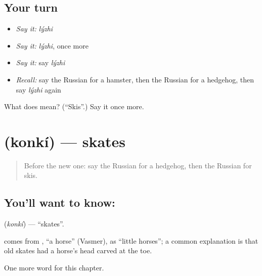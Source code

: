 \subsection*{Your turn}
\begin{itemize}
\raggedright
  \item \emph{Say it:} \emph{lýzhi}
  \item \emph{Say it:} \emph{lýzhi}, once more
  \item \emph{Say it:} say \emph{lýzhi}
  \item \emph{Recall:} say the Russian for a hamster, then the Russian for a hedgehog, then say \emph{lýzhi} again
\end{itemize}

\begin{tcolorbox}[breakable,colback=teal!4,colframe=teal!35!black,title={Before you move on}]
What does  mean? (\textquotedblleft{}Skis\textquotedblright{}.) Say it once more.
\end{tcolorbox}
\section[\texorpdfstring{\ru{коньки} (konkí)}{коньки (konkí)}]{ (konkí) — skates}

\label{lesson:RU-C166-konki}



\begin{quote}
Before the new one: say the Russian for a hedgehog, then the Russian for skis.
\end{quote}

\subsection*{You'll want to know: }
\textbf{} (\emph{konkí}) — \textquotedblleft{}skates\textquotedblright{}.

\begin{cousinweb}
\textbf{} comes from \emph{}, \textquotedblleft{}a horse\textquotedblright{} (Vasmer), as \textquotedblleft{}little horses\textquotedblright{}; a common explanation is that old skates had a horse's head carved at the toe.
\end{cousinweb}

\begin{grammarlens}[title={What you've built}]
One more word for this chapter.
\end{grammarlens}

